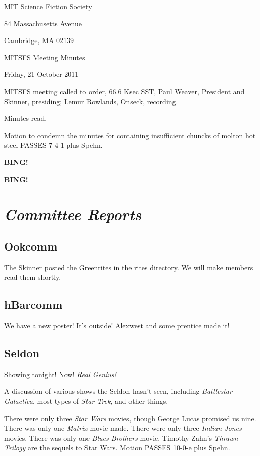 \documentclass[10pt]{article}
\newcommand{\bing}{{\bf BING!} }
\newcommand{\goto}[1]{\bing \vskip 12pt \section*{{\em{#1}}}}
\newcommand{\ps}{ plus Spehn\xspace}
\newcommand{\skinner}{Paul Weaver, President and Skinner}
\newcommand{\onseck}{Lemur Rowlands, Onseck}
\newcommand{\meetingdate}{Friday, 21 October 2011}
\begin{document}
\begin{center}

MIT Science Fiction Society

84 Massachusetts Avenue

Cambridge, MA 02139

\vspace{12pt}

MITSFS Meeting Minutes

\meetingdate

\end{center}

\vspace{18pt}

\setlength{\parskip}{6pt}

\noindent
MITSFS meeting called to order, 66.6 Ksec SST,
\skinner, presiding; \onseck, recording.

Minutes read.

Motion to condemn the minutes for containing insufficient chuncks
of molton hot steel PASSES 7-4-1\ps.

\bing

\goto{Committee Reports}

\subsection*{Ookcomm}

The Skinner posted the Greenrites in the rites directory.
We will make members read them shortly.

\subsection*{hBarcomm}

We have a new poster!  It's outside!  Alexwest and some 
prentice made it!

\subsection*{Seldon}

Showing tonight!  Now!  \emph{Real Genius!}

A discussion of various shows the Seldon hasn't seen, including
\emph{Battlestar Galactica}, most types of \emph{Star Trek},
and other things.

There were only three \emph{Star Wars} movies, though George Lucas
promised us nine.  There was only one \emph{Matrix} movie made.
There were only three \emph{Indian Jones} movies.  There was only one
\emph{Blues Brothers} movie.  Timothy Zahn's \emph{Thrawn Trilogy}
are the sequels to Star Wars.  Motion PASSES 10-0-e\ps.
\end{document}
